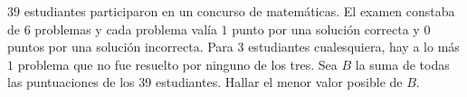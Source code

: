 $39$ estudiantes participaron en un concurso de matemáticas. El examen constaba de $6$ problemas y cada problema valía $1$ punto por una solución correcta y $0$ puntos por una solución incorrecta. Para $3$ estudiantes cualesquiera, hay a lo más $1$ problema que no fue resuelto por ninguno de los tres. Sea $B$ la suma de todas las puntuaciones de los $39$ estudiantes. Hallar el menor valor posible de $B$.
